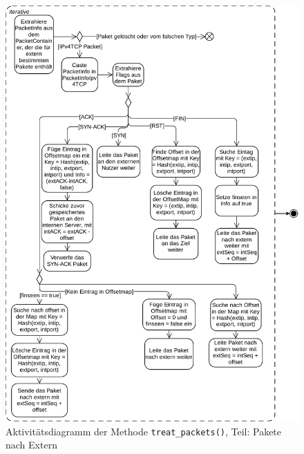 \documentclass[../review_2.tex]{subfiles}
\begin{document}
\begin{figure}[h]
    \centering
    \includegraphics[width=0.96\linewidth]{img/treat_packets_1.pdf}
    \caption{Aktivitätsdiagramm der Methode \texttt{treat\_packets()}, Teil: Pakete nach Extern}
    \label{Aktivität_treat_packet_1}
\end{figure}
\end{document}
